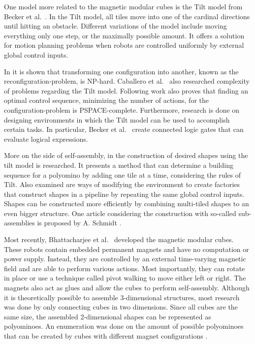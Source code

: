 One model more related to the magnetic modular cubes is the Tilt model from Becker et al.\ \cite{Becker2014_SP}.
In the Tilt model, all tiles move into one of the cardinal directions until hitting an obstacle.
Different variations of the model include moving everything only one step, or the maximally possible amount.
It offers a solution for motion planning problems when robots are controlled uniformly by external global control inputs.

In \cite{Becker2014_SP} it is shown that transforming one configuration into another, known as the reconfiguration-problem, is NP-hard.
Caballero et al.\ \cite{caballero2020} also researched complexity of problems regarding the Tilt model.
Following work \cite{Becker2014} also proves that finding an optimal control sequence, minimizing the number of actions, for the configuration-problem is PSPACE-complete.
Furthermore, research is done on designing environments in which the Tilt model can be used to accomplish certain tasks.
In particular, Becker et al.\ \cite{Becker2014} create connected logic gates that can evaluate logical expressions.

More on the side of self-assembly, in \cite{Becker2020} the construction of desired shapes using the tilt model is researched.
It presents a method that can determine a building sequence for a polyomino by adding one tile at a time, considering the rules of Tilt.
Also examined are ways of modifying the environment to create factories that construct shapes in a pipeline by repeating the same global control inputs.
Shapes can be constructed more efficiently by combining multi-tiled shapes to an even bigger structure.
One article considering the construction with so-called sub-assemblies is proposed by A. Schmidt \cite{Schmidt2018}.

Most recently, Bhattacharjee et al.\ \cite{Bhattacharjee2022} developed the magnetic modular cubes.
These robots contain embedded permanent magnets and have no computation or power supply.
Instead, they are controlled by an external time-varying magnetic field and are able to perform various actions.
Most importantly, they can rotate in place or use a technique called pivot walking to move either left or right.
The magnets also act as glues and allow the cubes to perform self-assembly.
Although it is theoretically possible to assemble 3-dimensional structures, most research was done by only connecting cubes in two dimensions.
Since all cubes are the same size, the assembled 2-dimensional shapes can be represented as polyominoes.
An enumeration was done on the amount of possible polyominoes that can be created by cubes with different magnet configurations \cite{Lu2021}.

